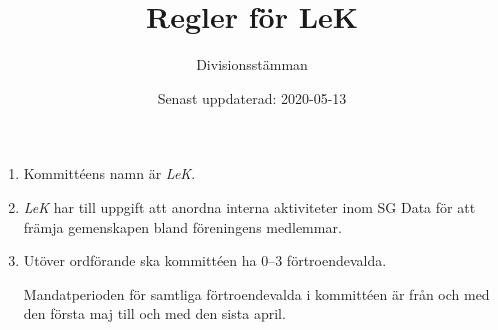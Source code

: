 \documentclass{dvd}
\begin{document}
	\title{Regler för LeK}
	\author{Divisionsstämman}
	\date{Senast uppdaterad: 2020-05-13}

	\begin{enumerate}[label=\arabic* §, ref=\arabic*]
		\item Kommittéens namn är \emph{LeK}.
	
		\item \emph{LeK} har till uppgift att anordna interna aktiviteter inom SG Data för att främja gemenskapen bland föreningens medlemmar.

		\item Utöver ordförande ska kommittéen ha 0--3 förtroendevalda.

		Mandatperioden för samtliga förtroendevalda i kommittéen är från och med den första maj till och med den sista april.
	\end{enumerate}
\end{document}
